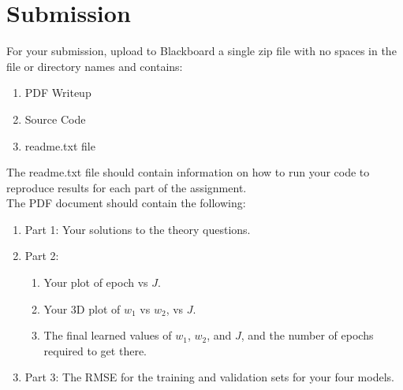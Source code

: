 \documentclass[12pt]{article}
\begin{document}
\newpage
\section*{Submission}
For your submission, upload to Blackboard a single zip file with no spaces in the file or directory names and contains:

\begin{enumerate}
\item PDF Writeup
\item Source Code
\item readme.txt file
\end{enumerate}

\noindent
The readme.txt file should contain information on how to run your code to reproduce results for each part of the assignment.\\

\noindent
The PDF document should contain the following:

\begin{enumerate}
\item Part 1: Your solutions to the theory questions.
\item Part 2: 
	\begin{enumerate}
	\item Your plot of epoch vs $J$.
	\item Your 3D plot of $w_1$ vs $w_2$, vs $J$.
	\item The final learned values of $w_1$, $w_2$, and $J$, and the number of epochs required to get there.
	\end{enumerate}
\item Part 3: The RMSE for the training and validation sets for your four models.
\end{enumerate}
\end{document}
